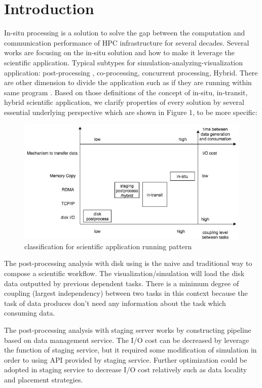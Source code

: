 \section{Introduction}

In-situ processing is a solution to solve the gap between the computation and communication performance of HPC infrastructure for several decades\cite{childs2012situ}. Several works are focusing on the in-situ solution and how to make it leverage the scientific application\cite{bauer2016situ,oldfield2014evaluation}. Typical subtypes for simulation-analyzing-visualization application\cite{childs2012situ}: post-processing , co-processing, concurrent processing, Hybrid. There are other dimension to divide the application such as if they are running within same program \cite{dreher2017decaf}. Based on those definitions of the concept of in-situ, in-transit, hybrid scientific application, we clarify properties of every solution by several  essential underlying perspective which are shown in Figure 1, to be more specific:

\begin{figure} 
\centering
\includegraphics[width=.95\linewidth]{./figure/application_classification.jpg}
\caption{classification for scientific application running pattern}
 \label{fg:state}
\end{figure} 

The post-processing analysis with disk using is the naive and traditional way to compose a scientific workflow. The visualization/simulation will load the disk data outputted by previous dependent tasks. There is a minimum degree of coupling (largest independency) between two tasks in this context because the task of data produces don't need any information about the task which consuming data. 

The post-processing analysis with staging server works by constructing pipeline based on data management service. The I/O cost can be decreased by leverage the function of staging service, but it required some modification of simulation in order to using API provided by staging service. Further optimization could be adopted in staging service to decrease I/O cost relatively such as data locality and placement strategies.

